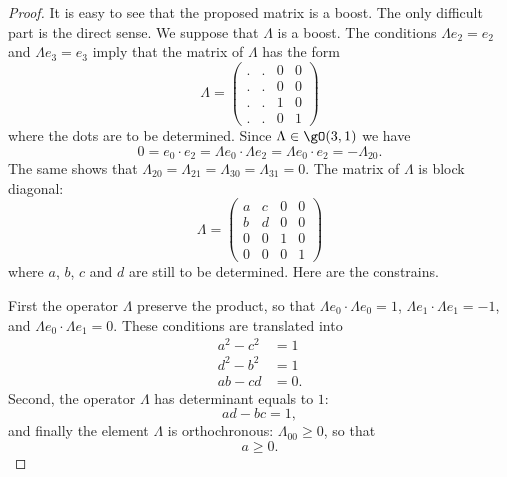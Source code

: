 \begin{proof}
	It is easy to see that the proposed matrix is a boost. The only difficult part is the direct sense. We suppose that \( \Lambda\) is a boost. The conditions \( \Lambda e_2=e_2\) and \( \Lambda e_3=e_3\) imply that the matrix of \( \Lambda\) has the form
	\begin{equation}
		\Lambda=\begin{pmatrix}
			. & . & 0 & 0 \\
			. & . & 0 & 0 \\
			. & . & 1 & 0 \\
			. & . & 0 & 1
		\end{pmatrix}
	\end{equation}
	where the dots are to be determined. Since \( \Lambda\in\gO(3,1)\) we have
	\begin{equation}
		0=e_0\cdot e_2=\Lambda e_0\cdot \Lambda e_2=\Lambda e_0\cdot e_2=-\Lambda_{20}.
	\end{equation}
	The same shows that \( \Lambda_{20}=\Lambda_{21}=\Lambda_{30}=\Lambda_{31}=0\). The matrix of \( \Lambda\) is block diagonal:
	\begin{equation}
		\Lambda=\begin{pmatrix}
			a & c & 0 & 0 \\
			b & d & 0 & 0 \\
			0 & 0 & 1 & 0 \\
			0 & 0 & 0 & 1
		\end{pmatrix}
	\end{equation}
	where \( a\), \( b\), \( c\) and \( d\) are still to be determined. Here are the constrains.

	First the operator \( \Lambda\) preserve the product, so that \( \Lambda e_0\cdot \Lambda e_0=1\), \( \Lambda e_1\cdot \Lambda e_1=-1\), and \( \Lambda e_0\cdot \Lambda e_1=0\). These conditions are translated into
	\begin{subequations}
		\begin{align}
			a^2-c^2 & =1  \label{SUBEQooWEJSooPWfmNS}      \\
			d^2-b^2 & =1     \label{SUBEQooKLZFooCovszD}   \\
			ab-cd   & =0.      \label{SUBEQooUZQWooUxUCSe}
		\end{align}
	\end{subequations}
	Second, the operator \( \Lambda\) has determinant equals to \( 1\):
	\begin{equation}        \label{EQooJAEKooTCZaIG}
		ad-bc=1,
	\end{equation}
	and finally the element \( \Lambda\) is orthochronous: \( \Lambda_{00}\geq 0\), so that
	\begin{equation}        \label{EQooQCMYooPhHeas}
		a\geq 0.
	\end{equation}


\end{proof}
